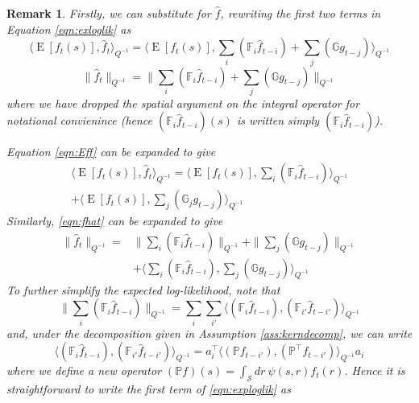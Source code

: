 \documentclass{IEEEtran}
\newcommand{\inner}[3]{\langle#1,#2\rangle_{#3}}
\newcommand{\dist}[2]{\|#1\|_{#2}}
\DeclareMathOperator{\E}{E}
\newtheorem{remark}{Remark}
\begin{document}
\begin{remark}
Firstly, we can substitute for $\hat{f}$, rewriting the first two terms in Equation \ref{eqn:exloglik} as
\begin{equation}
	\label{eqn:Eff}
	\inner{\E[f_t(s)]}{\hat{f}_t}{Q^{-1}} = \inner{\E[f_t(s)]}{\sum_i(\mathbb{F}_i\hat{f}_{t-i}) + \sum_j(\mathbb{G}g_{t-j})}{Q^{-1}}
\end{equation}
\begin{equation}
	\label{eqn:fhat}
	\dist{\hat{f}_t}{Q^{-1}} = \dist{\sum_i(\mathbb{F}_i\hat{f}_{t-i}) + \sum_j(\mathbb{G}g_{t-j})}{Q^{-1}}
\end{equation}
where we have dropped the spatial argument on the integral operator for notational convienince (hence $(\mathbb{F}_i\hat{f}_{t-i})(s)$ is written simply $(\mathbb{F}_i\hat{f}_{t-i})$). 

Equation \ref{eqn:Eff} can be expanded to give
\begin{equation}
	\begin{split}
	\inner{\E[f_t(s)]}{\hat{f}_t}{Q^{-1}} 
	 = \inner
		{\E[f_t(s)]}
		{\sum_i(\mathbb{F}_i\hat{f}_{t-i})}
		{Q^{-1}} \\
	+ \inner
		{\E[f_t(s)]}
		{\sum_j(\mathbb{G}_jg_{t-j})}
		{Q^{-1}}
	\end{split}
\end{equation}
Similarly, \ref{eqn:fhat} can be expanded to give
\begin{equation}
	\begin{split}
	\dist
		{\hat{f}_t}
		{Q^{-1}} 
	= & \dist
		{\sum_i(\mathbb{F}_i\hat{f}_{t-i})}
		{Q^{-1}} 
	+ \dist
		{\sum_j(\mathbb{G}g_{t-j})}
		{Q^{-1}}\\
	& + \inner
		{\sum_i(\mathbb{F}_i\hat{f}_{t-i})}
		{\sum_j(\mathbb{G}g_{t-j})}
		{Q^{-1}}
	\end{split}
\end{equation}
To further simplify the expected log-likelihood, note that
\begin{equation}
	\dist{\sum_i(\mathbb{F}_i\hat{f}_{t-i})}
	{Q^{-1}} = 
	\sum_i \sum_{i'} \inner
		{(\mathbb{F}_i\hat{f}_{t-i})}
		{(\mathbb{F}_{i'}\hat{f}_{t-i'})}
		{Q^{-1}}
\end{equation}
and, under the decomposition given in Assumption \ref{ass:kerndecomp}, we can write
\begin{equation}
	\inner
		{(\mathbb{F}_i\hat{f}_{t-i})}
		{(\mathbb{F}_{i'}\hat{f}_{t-i'})}
		{Q^{-1}} =  
	 a_i^\top \inner 
		{(\mathbb{P} f_{t-i'})}
		{(\mathbb{P}^\top f_{t-i'}) }
		{Q^{-1}} a_i
\end{equation}
where we define a new operator $(\mathbb{P} f)(s) = \int_\mathcal{S}dr~\psi(s,r)f_t(r)$. Hence it is straightforward to write the first term of \ref{eqn:exploglik} as

\end{remark}
\end{document}
